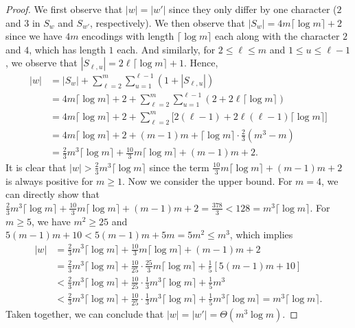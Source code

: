 \begin{reminderclaim}{}
    \claimlength
\end{reminderclaim}

\begin{proof}
We first observe that $|w|=|w'|$ since they only differ by one character ($2$ and $3$ in $S_w$ and $S_{w'}$, respectively). We then observe that $|S_w|=4m\lceil\log m\rceil + 2$ since we have $4m$ encodings with length $\lceil\log m\rceil$ each along with the character $2$ and $4$, which has length $1$ each. And similarly, for $2\leq\ell\leq m$ and $1\leq u\leq \ell-1$, we observe that $|S_{\ell,u}|=2\ell\lceil\log m\rceil + 1$. Hence,
\begin{align*}
    |w| &= |S_w| + \sum_{\ell=2}^m \sum_{u=1}^{\ell-1} \left(1+|S_{\ell,u}|\right) \\
    &= 4m\lceil\log m\rceil + 2 + \sum_{\ell=2}^m \sum_{u=1}^{\ell-1} \left(2 + 2\ell\lceil\log m\rceil\right)\\
    &= 4m\lceil\log m\rceil + 2 + \sum_{\ell=2}^m \big[2(\ell-1) + 2\ell(\ell-1)\lceil\log m\rceil\big] \\
    &= 4m\lceil\log m\rceil + 2 + (m-1)m + \lceil\log m\rceil \cdot\frac{2}{3}\left( m^3-m \right) \\
    &= \frac{2}{3}m^3\lceil\log m\rceil + \frac{10}{3} m\lceil\log m\rceil + (m-1)m+2.
\end{align*}
It is clear that $|w|>\frac{2}{3}m^3\lceil\log m\rceil$ since the term $\frac{10}{3} m\lceil\log m\rceil + (m-1)m+2$ is always positive for $m\geq 1$. Now we consider the upper bound. For $m=4$, we can directly show that $\frac{2}{3}m^3\lceil\log m\rceil + \frac{10}{3} m\lceil\log m\rceil + (m-1)m+2=\frac{378}{3}<128=m^3\lceil\log m\rceil$. For $m\geq 5$, we have $m^2\geq 25$ and $5(m-1)m+10<5(m-1)m+5m=5m^2\leq m^3$, which implies
\begin{align*}
    |w| &= \frac{2}{3}m^3\lceil\log m\rceil + \frac{10}{3} m\lceil\log m\rceil + (m-1)m+2\\
    &= \frac{2}{3}m^3\lceil\log m\rceil + \frac{10}{25}\cdot\frac{25}{3}m\lceil\log m\rceil + \frac{1}{5}\left[5(m-1)m+10\right]\\
    &< \frac{2}{3}m^3\lceil\log m\rceil + \frac{10}{25}\cdot\frac{1}{3}m^3\lceil\log m\rceil + \frac{1}{5}m^3\\
    &< \frac{2}{3}m^3\lceil\log m\rceil + \frac{10}{25}\cdot\frac{1}{3}m^3\lceil\log m\rceil + \frac{1}{5}m^3\lceil\log m\rceil = m^3\lceil\log m\rceil.
\end{align*}
Taken together, we can conclude that $|w|=|w'|=\Theta(m^3\log m)$.
\end{proof}

